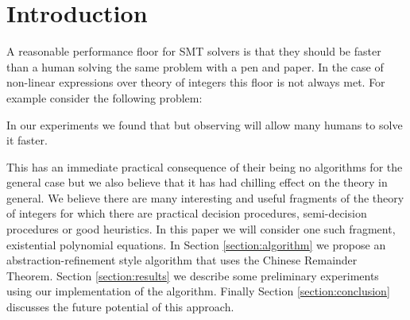 \section{Introduction}

A reasonable performance floor for SMT solvers is that they should be
faster than a human solving the same problem with a pen and paper.
%
In the case of non-linear expressions over theory of integers this
floor is not always met.
%
For example consider the following problem:


In our experiments we found that  but observing  will allow
many humans to solve it faster.

This has an immediate practical consequence of their being no
algorithms for the general case but we also believe that it has had
chilling effect on the theory in general.
%
We believe there are many interesting and useful fragments of the
theory of integers for which there are practical decision procedures,
semi-decision procedures or good heuristics.
%
In this paper we will consider one such fragment, existential
polynomial equations.
%
In Section \ref{section:algorithm} we propose an
abstraction-refinement style algorithm that uses the Chinese Remainder
Theorem.
Section \ref{section:results} we describe some preliminary experiments
using our implementation of the algorithm.
Finally Section \ref{section:conclusion} discusses the future
potential of this approach.





